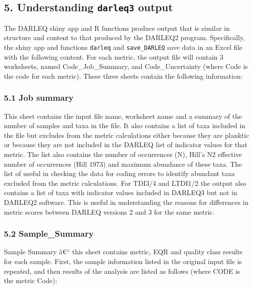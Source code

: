 \documentclass[]{article}
\begin{document}
\hypertarget{understanding-darleq3-output}{%
\subsection{\texorpdfstring{5. Understanding \texttt{darleq3}
output}{5. Understanding darleq3 output}}\label{understanding-darleq3-output}}

The DARLEQ shiny app and R functions produce output that is similar in
structure and content to that produced by the DARLEQ2 program.
Specifically, the shiny app and functions \texttt{darleq} and
\texttt{save\_DARLEQ} save data in an Excel file with the following
content. For each metric, the output file will contain 3 worksheets,
named Code\_Job\_Summary, and Code\_Uncertainty (where Code is the code
for each metric). These three sheets contain the following information:

\hypertarget{job-summary}{%
\subsubsection{5.1 Job summary}\label{job-summary}}

This sheet contains the input file name, worksheet name and a summary of
the number of samples and taxa in the file. It also contains a list of
taxa included in the file but excludes from the metric calculations
either because they are planktic or because they are not included in the
DARLEQ list of indicator values for that metric. The list also contains
the number of occurrences (N), Hill's N2 effective number of occurrences
(Hill 1973) and maximum abundance of these taxa. The list of useful in
checking the data for coding errors to identify abundant taxa excluded
from the metric calculations. For TDI3/4 and LTDI1/2 the output also
contains a list of taxa with indicator values included in DARLEQ3 but
not in DARLEQ2 software. This is useful in understanding the reasons for
differences in metric scores between DARLEQ versions 2 and 3 for the
same metric.

\hypertarget{sample_summary}{%
\subsubsection{5.2 Sample\_Summary}\label{sample_summary}}

Sample Summary â€`` this sheet contains metric, EQR and quality class
results for each sample. First, the sample information listed in the
original input file is repeated, and then results of the analysis are
listed as follows (where CODE is the metric Code):
\end{document}
